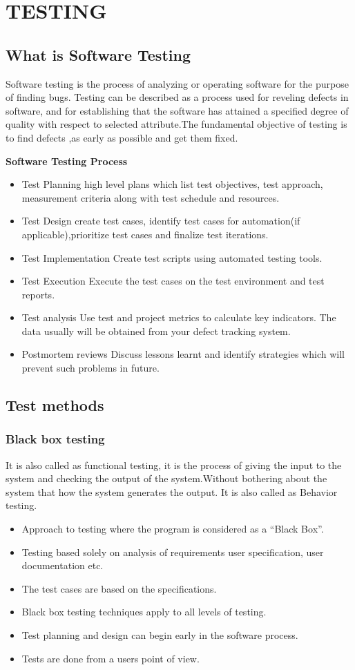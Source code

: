 \chapter{TESTING}
\section{What is Software Testing}

Software testing is the process of analyzing or operating software for the purpose of finding bugs.
Testing can be described as a process used for reveling defects in software, and for establishing that the software has attained a specified degree of quality with respect to selected attribute.The fundamental objective of testing is to find defects ,as early as possible and get them fixed.

{\bf Software Testing Process}
\begin{itemize}
\item Test Planning
 high level plans which list test objectives, test approach, measurement criteria along with test schedule and resources.
 \item Test Design
create test cases, identify test cases for automation(if applicable),prioritize test cases and finalize test iterations.
\item Test Implementation
Create test scripts using automated testing tools.
\item Test Execution
Execute the test cases on the test environment and test reports.
\item Test analysis
Use test and project metrics to calculate key indicators. The data usually will be obtained from your defect tracking system.
\item Postmortem reviews
Discuss lessons learnt and identify strategies which will prevent such problems in future.
\end{itemize}
\section{Test methods}

\subsection{Black box testing }
It is also called as functional testing, it is the process of giving the input to the system and checking the output of the system.Without bothering about the system that how the system generates the output. It is also called as Behavior testing.
\begin{itemize}
\item Approach to testing where the program is considered as a “Black Box”.
\item Testing based solely on analysis of requirements  user specification, user documentation etc.
\item The test cases are based on the specifications.
\item Black box testing techniques apply to all levels of testing.
\item Test planning and design can begin early in the software process.
\item Tests are done from a users point of view.
\end{itemize}
